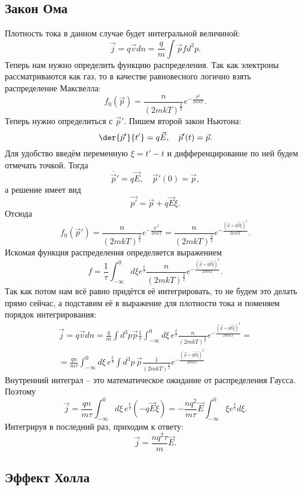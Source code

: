 \subsection{Закон Ома}
Плотность тока в данном случае будет интегральной величиной:
\[
    \vec{j} = q\vec{v}dn = \frac{q}{m}\int\vec{p} f d^3p.
\]
Теперь нам нужно определить функцию распределения. Так как электроны
рассматриваются как газ, то в качестве равновесного логично взять распределение
Максвелла:
\[
    f_0(\vec{p}) = \frac{n}{(2mkT)^\frac{3}{2}}e^{-\frac{p^2}{2mkT}}.
\]
Теперь нужно определиться с \( \vec{p}' \). Пишем второй закон Ньютона:
\[
    \der{\vec{p}'}{t'} = q\vec{E}, \quad \vec{p}'(t) = \vec{p}.
\]
Для удобство введём переменную \( \xi = t' - t \) и дифференцирование по ней
будем отмечать точкой. Тогда
\[
    \dot{\vec{p}'} = q\vec{E}, \quad \vec{p}'(0) = \vec{p},
\]
а решение имеет вид
\[
    \vec{p'} = \vec{p} + q\vec{E}\xi.
\]
Отсюда
\[
    f_0(\vec{p}') = \frac{n}{(2mkT)^\frac{3}{2}}e^{-\frac{{p'}^2}{2mkT}} =
    \frac{n}{(2mkT)^\frac{3}{2}}e^{-\frac{(\vec{p} + q\vec{E}\xi)^2 }{2mkT}}.
\]
Искомая функция распределения определяется выражением
\[
    f = \frac{1}{\tau}\int_{-\infty}^0 d\xi e^\frac{\xi}{\tau}
    \frac{n}{(2mkT)^\frac{3}{2}}e^{-\frac{(\vec{p} + q\vec{E}\xi)^2 }{2mkT}}.
\]
Так как потом нам всё равно придётся её интегрировать, то не будем это делать
прямо сейчас, а подставим её в выражение для плотности тока и поменяем порядок
интегрирования:
\begin{gather*}
    \vec{j} = q\vec{v}dn = \frac{q}{m}\int d^3p \vec{p}
    \frac{1}{\tau}\int_{-\infty}^0 d\xi\, e^\frac{\xi}{\tau}
    \frac{n}{(2mkT)^\frac{3}{2}}e^{-\frac{(\vec{p} + q\vec{E}\xi)^2 }{2mkT}}
    = \\ =
    \frac{qn}{m\tau}
    \int_{-\infty}^0 d\xi\, e^\frac{\xi}{\tau}\int d^3p\, \vec{p}
    \frac{1}{(2mkT)^\frac{3}{2}}e^{-\frac{(\vec{p} + q\vec{E}\xi)^2 }{2mkT}}
\end{gather*}
Внутренний интеграл -- это математическое ожидание от распределения Гаусса.
Поэтому
\[
    \vec{j} = \frac{qn}{m\tau}
    \int_{-\infty}^0 d\xi\, e^\frac{\xi}{\tau} (-q\vec{E}\xi) =
    -\frac{nq^2}{m\tau} \vec{E} \int_{-\infty}^0 \xi e^\frac{\xi}{\tau}d\xi.
\]
Интегрируя в последний раз, приходим к ответу:
\[
    \vec{j} = \frac{nq^2\tau}{m}\vec{E}.
\]
\subsection{Эффект Холла}

